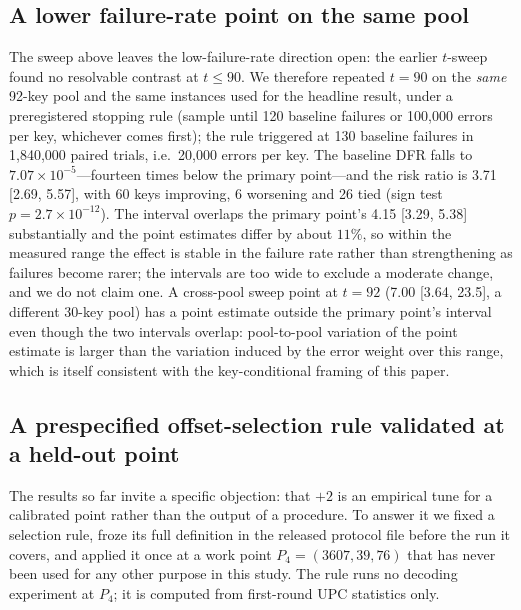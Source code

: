 \documentclass[lettersize,journal]{IEEEtran}
\begin{document}
\subsection{A lower failure-rate point on the same pool}\label{sec:lowdfr}

The sweep above leaves the low-failure-rate direction open: the earlier $t$-sweep found no resolvable contrast at $t\le90$. We therefore repeated $t=90$ on the \emph{same} 92-key pool and the same instances used for the headline result, under a preregistered stopping rule (sample until 120 baseline failures or 100{,}000 errors per key, whichever comes first); the rule triggered at 130 baseline failures in 1{,}840{,}000 paired trials, i.e.\ 20{,}000 errors per key. The baseline DFR falls to $7.07\times10^{-5}$---fourteen times below the primary point---and the risk ratio is 3.71 [2.69, 5.57], with 60 keys improving, 6 worsening and 26 tied (sign test $p=2.7\times10^{-12}$). The interval overlaps the primary point's 4.15 [3.29, 5.38] substantially and the point estimates differ by about $11\%$, so within the measured range the effect is stable in the failure rate rather than strengthening as failures become rarer; the intervals are too wide to exclude a moderate change, and we do not claim one. A cross-pool sweep point at $t=92$ (7.00 [3.64, 23.5], a different 30-key pool) has a point estimate outside the primary point's interval even though the two intervals overlap: pool-to-pool variation of the point estimate is larger than the variation induced by the error weight over this range, which is itself consistent with the key-conditional framing of this paper.

\subsection{A prespecified offset-selection rule validated at a held-out point}\label{sec:rule}

The results so far invite a specific objection: that $+2$ is an empirical tune for a calibrated point rather than the output of a procedure. To answer it we fixed a selection rule, froze its full definition in the released protocol file before the run it covers, and applied it once at a work point $P_4=(3607,39,76)$ that has never been used for any other purpose in this study. The rule runs no decoding experiment at $P_4$; it is computed from first-round UPC statistics only.
\end{document}
